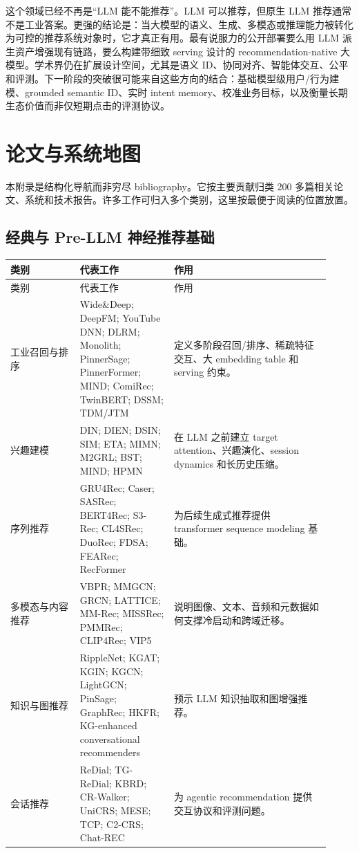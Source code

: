 \documentclass[UTF8,fontset=fandol,11pt]{ctexart}
\begin{document}
这个领域已经不再是“LLM 能不能推荐”。LLM 可以推荐，但原生 LLM 推荐通常不是工业答案。更强的结论是：当大模型的语义、生成、多模态或推理能力被转化为可控的推荐系统对象时，它才真正有用。最有说服力的公开部署要么用 LLM 派生资产增强现有链路，要么构建带细致 serving 设计的 recommendation-native 大模型。学术界仍在扩展设计空间，尤其是语义 ID、协同对齐、智能体交互、公平和评测。下一阶段的突破很可能来自这些方向的结合：基础模型级用户/行为建模、grounded semantic ID、实时 intent memory、校准业务目标，以及衡量长期生态价值而非仅短期点击的评测协议。

\appendix
\section{论文与系统地图}

本附录是结构化导航而非穷尽 bibliography。它按主要贡献归类 200 多篇相关论文、系统和技术报告。许多工作可归入多个类别，这里按最便于阅读的位置放置。

\subsection{经典与 Pre-LLM 神经推荐基础}

\small
\begin{longtable}{@{}p{0.20\linewidth}p{0.27\linewidth}p{0.45\linewidth}@{}}
\toprule
类别 & 代表工作 & 作用\\
\midrule
\endfirsthead
\toprule
类别 & 代表工作 & 作用\\
\midrule
\endhead
工业召回与排序 & Wide\&Deep; DeepFM; YouTube DNN; DLRM; Monolith; PinnerSage; PinnerFormer; MIND; ComiRec; TwinBERT; DSSM; TDM/JTM & 定义多阶段召回/排序、稀疏特征交互、大 embedding table 和 serving 约束。\\
兴趣建模 & DIN; DIEN; DSIN; SIM; ETA; MIMN; M2GRL; BST; MIND; HPMN & 在 LLM 之前建立 target attention、兴趣演化、session dynamics 和长历史压缩。\\
序列推荐 & GRU4Rec; Caser; SASRec; BERT4Rec; S3-Rec; CL4SRec; DuoRec; FDSA; FEARec; RecFormer & 为后续生成式推荐提供 transformer sequence modeling 基础。\\
多模态与内容推荐 & VBPR; MMGCN; GRCN; LATTICE; MM-Rec; MISSRec; PMMRec; CLIP4Rec; VIP5 & 说明图像、文本、音频和元数据如何支撑冷启动和跨域迁移。\\
知识与图推荐 & RippleNet; KGAT; KGIN; KGCN; LightGCN; PinSage; GraphRec; HKFR; KG-enhanced conversational recommenders & 预示 LLM 知识抽取和图增强推荐。\\
会话推荐 & ReDial; TG-ReDial; KBRD; CR-Walker; UniCRS; MESE; TCP; C2-CRS; Chat-REC & 为 agentic recommendation 提供交互协议和评测问题。\\
\bottomrule
\end{longtable}
\normalsize
\end{document}
